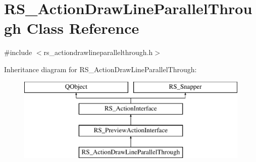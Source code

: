 \hypertarget{classRS__ActionDrawLineParallelThrough}{\section{R\-S\-\_\-\-Action\-Draw\-Line\-Parallel\-Through Class Reference}
\label{classRS__ActionDrawLineParallelThrough}
}


{\ttfamily \#include $<$rs\-\_\-actiondrawlineparallelthrough.\-h$>$}

Inheritance diagram for R\-S\-\_\-\-Action\-Draw\-Line\-Parallel\-Through\-:\begin{figure}[H]
\begin{center}
\leavevmode
\includegraphics[height=4.000000cm]{classRS__ActionDrawLineParallelThrough}
\end{center}
\end{figure}
